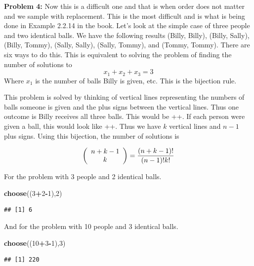 \documentclass[]{book}
\newenvironment{Shaded}{\begin{snugshade}}{\end{snugshade}}
\newcommand{\KeywordTok}[1]{\textcolor[rgb]{0.13,0.29,0.53}{\textbf{#1}}}
\newcommand{\DecValTok}[1]{\textcolor[rgb]{0.00,0.00,0.81}{#1}}
\newcommand{\OperatorTok}[1]{\textcolor[rgb]{0.81,0.36,0.00}{\textbf{#1}}}
\newcommand{\NormalTok}[1]{#1}
\theoremstyle{definition}
\theoremstyle{definition}
\theoremstyle{definition}
\theoremstyle{remark}
\begin{document}
\textbf{Problem 4:} Now this is a difficult one and that is when order
does not matter and we sample with replacement. This is the most
difficult and is what is being done in Example 2.2.14 in the book. Let's
look at the simple case of three people and two identical balls. We have
the following results (Billy, Billy), (Billy, Sally), (Billy, Tommy),
(Sally, Sally), (Sally, Tommy), and (Tommy, Tommy). There are six ways
to do this. This is equivalent to solving the problem of finding the
number of solutions to \[x_1 + x_2 + x_3 =3\] Where \(x_1\) is the
number of balls Billy is given, etc. This is the bijection rule.

This problem is solved by thinking of vertical lines representing the
numbers of balls someone is given and the plus signs between the
vertical lines. Thus one outcome is Billy receives all three balls. This
would be \textbar{}\textbar{}\textbar{}++. If each person were given a
ball, this would look like \textbar{}+\textbar{}+\textbar{}. Thus we
have \(k\) vertical lines and \(n-1\) plus signs. Using this bijection,
the number of solutions is

\[\left( {\begin{array}{c}n+k-1 \\ k \end{array}} \right) = {(n+k-1)! \over (n-1)!k!}\]

For the problem with 3 people and 2 identical balls.

\begin{Shaded}
\begin{Highlighting}[]
\KeywordTok{choose}\NormalTok{((}\DecValTok{3}\OperatorTok{+}\DecValTok{2}\OperatorTok{-}\DecValTok{1}\NormalTok{),}\DecValTok{2}\NormalTok{)}
\end{Highlighting}
\end{Shaded}

\begin{verbatim}
## [1] 6
\end{verbatim}

And for the problem with 10 people and 3 identical balls.

\begin{Shaded}
\begin{Highlighting}[]
\KeywordTok{choose}\NormalTok{((}\DecValTok{10}\OperatorTok{+}\DecValTok{3}\OperatorTok{-}\DecValTok{1}\NormalTok{),}\DecValTok{3}\NormalTok{)}
\end{Highlighting}
\end{Shaded}

\begin{verbatim}
## [1] 220
\end{verbatim}
\end{document}
